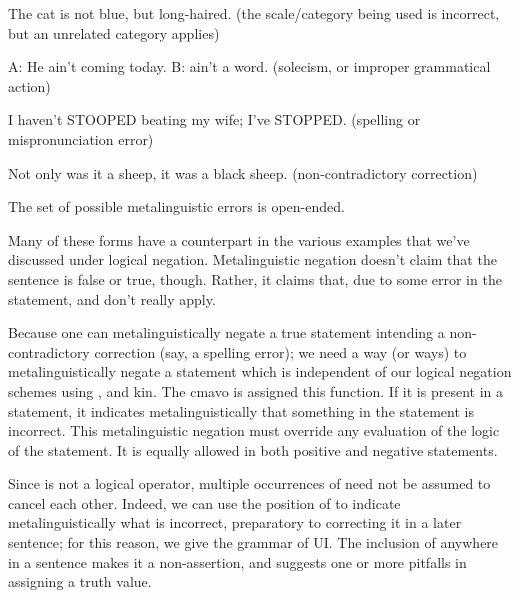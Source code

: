 \begin{example}
The cat is not blue, but long-haired.\n
(the scale/category being used is incorrect, but an\n
unrelated category applies)
\end{example}

\begin{example}
A: He ain't coming today.\n
B:  ain't a word.\n
(solecism, or improper grammatical action)
\end{example}

\begin{example}
I haven't STOOPED beating my wife; I've STOPPED.\n
(spelling or mispronunciation error)
\end{example}

\begin{example}
Not only was it a sheep, it was a black sheep.\n
(non-contradictory correction)
\end{example}

The set of possible metalinguistic errors is open-ended.

Many of these forms have a counterpart in the various
    examples that we've discussed under logical negation.
    Metalinguistic negation doesn't claim that the sentence is
    false or true, though. Rather, it claims that, due to some
    error in the statement,  and  don't really
    apply.

Because one can metalinguistically negate a true statement
    intending a non-contradictory correction (say, a spelling
    error); we need a way (or ways) to metalinguistically negate a
    statement which is independent of our logical negation schemes
    using ,  and kin. The cmavo  is assigned
    this function. If it is present in a statement, it indicates
    metalinguistically that something in the statement is
    incorrect. This metalinguistic negation must override any
    evaluation of the logic of the statement. It is equally allowed
    in both positive and negative statements.

Since  is not a logical operator, multiple
    occurrences of  need not be assumed to cancel each
    other. Indeed, we can use the position of  to indicate
    metalinguistically what is incorrect, preparatory to correcting
    it in a later sentence; for this reason, we give  the
    grammar of UI. The inclusion of  anywhere in a sentence
    makes it a non-assertion, and suggests one or more pitfalls in
    assigning a truth value.

